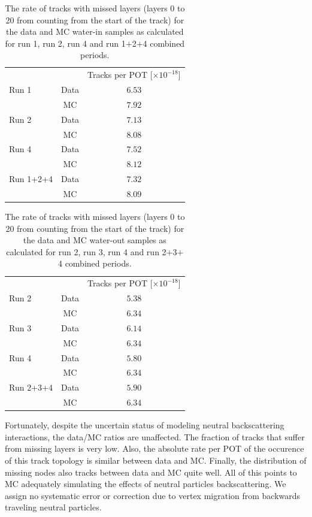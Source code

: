 \begin{table}[h]
\caption{The rate of tracks
with missed layers (layers 0 to 20 from counting from the start of the track)
for the data and MC water-in samples 
as calculated for run 1, run 2, run 4 and run 1$+$2$+$4 combined periods.
}
\centering
\begin{tabular}{lcc}\toprule
      & &  Tracks per POT [$\times 10^{-18}$] \\
\cline{2-3}
Run 1 & Data & $6.53$  \\ 
      & MC & $7.92$ \\ 
\cline{2-3}
Run 2 & Data & $7.13$  \\ 
      & MC & $8.08$ \\ 
\cline{2-3}
Run 4 & Data & $7.52$  \\ 
      & MC & $8.12$ \\ 
\cline{2-3}
Run 1+2+4 & Data & $7.32$  \\ 
      & MC & $8.09$ \\ 
\bottomrule
\end{tabular}

\label{tab:TracksWithMiss0to20perPTWaterIn}
\end{table}

\begin{table}[h]
\caption{The rate of tracks
with missed layers (layers 0 to 20 from counting from the start of the track)
for the data and MC water-out samples 
as calculated for run 2, run 3, run 4 and run 2$+$3$+$4 combined periods.
}
\centering
\begin{tabular}{lcc}\toprule
      & &  Tracks per POT [$\times 10^{-18}$] \\
\cline{2-3}
Run 2 & Data & $5.38$  \\ 
      & MC & $6.34$ \\ 
\cline{2-3}
Run 3 & Data & $6.14$  \\ 
      & MC & $6.34$ \\ 
\cline{2-3}
Run 4 & Data & $5.80$  \\ 
      & MC & $6.34$ \\ 
\cline{2-3}
Run 2+3+4 & Data & $5.90$  \\ 
      & MC & $6.34$ \\ 
\bottomrule
\end{tabular}
\label{tab:TracksWithMiss0to20perPTWaterOut}
\end{table}

Fortunately, despite the uncertain status of modeling neutral backscattering interactions, the data/MC ratios are unaffected. The fraction of tracks that suffer from missing layers is very low. Also, the absolute rate per POT of the occurence of this track topology is similar between data and MC. Finally, the distribution of missing nodes also tracks between data and MC quite well. All of this points to MC adequately simulating the effects of neutral particles backscattering. We assign no systematic error or correction due to vertex migration from backwards traveling neutral particles.

